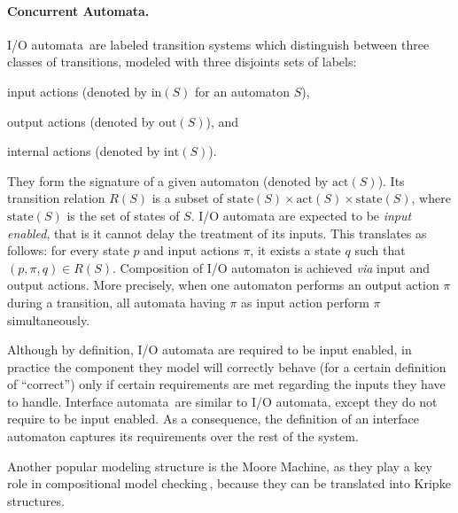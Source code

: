\paragraph{Concurrent Automata.}
%
I/O automata\,\cite{lynch1988ioautomata} are labeled transition systems which
distinguish between three classes of transitions, modeled with three disjoints
sets of labels:
%
\begin{inparaenum}[(1)]
\item input actions (denoted by \( \mathrm{in}(S) \) for an automaton \( S \)),
\item output actions (denoted by \( \mathrm{out}(S) \)), and
\item internal actions (denoted by \( \mathrm{int}(S) \)).
\end{inparaenum}
%
They form the signature of a given automaton (denoted by \( \mathrm{act}(S) \)).
%
Its transition relation \( R(S) \) is a subset of
\( \mathrm{state}(S) \times \mathrm{act}(S) \times \mathrm{state}(S) \), where
\( \mathrm{state}(S) \) is the set of states of \( S \).
%
I/O automata are expected to be \emph{input enabled}, that is it cannot delay
the treatment of its inputs.
%
This translates as follows: for every state \( p \) and input actions \( \pi \),
it exists a state \( q \) such that \( (p, \pi, q) \in R(S) \).
%
Composition of I/O automaton is achieved \emph{via} input and output actions.
%
More precisely, when one automaton performs an output action \( \pi \) during a
transition, all automata having \( \pi \) as input action perform \( \pi \)
simultaneously.

Although by definition, I/O automata are required to be input enabled, in
practice the component they model will correctly behave (for a certain
definition of ``correct'') only if certain requirements are met regarding the
inputs they have to handle.
%
Interface automata\,\cite{de2001interfaceautomata} are similar to I/O automata,
except they do not require to be input enabled.
%
As a consequence, the definition of an interface automaton captures its
requirements over the rest of the system.

Another popular modeling structure is the Moore Machine, as they play a key role
in compositional model checking\,\cite{mcmillan1989compositional}, because they
can be translated into Kripke structures.

